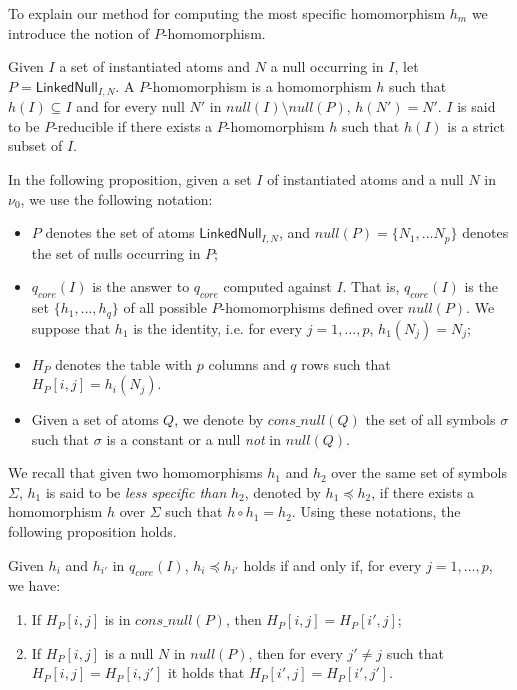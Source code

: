 
To explain our method for computing the most specific homomorphism $h_m$ we introduce the notion of $P$-homomorphism.

\begin{definition}
    Given $I$ a set of instantiated atoms and $N$ a null occurring in $I$, let $P=\textsf{LinkedNull}_{I,N}$.
    A $P$-homomorphism is a homomorphism $h$ such that $h(I) \subseteq I$ and for every null $N'$ in $null(I) \setminus null(P)$, $h(N')=N'$.
    $I$ is said to be $P$-reducible if there exists a $P$-homomorphism $h$ such that $h(I)$ is a strict subset of $I$.
\end{definition}

In the following proposition, given a set $I$ of instantiated atoms and a null $N$ in $\nu_0$, we use the following notation:
\begin{itemize}
    \item $P$ denotes the set of atoms $\textsf{LinkedNull}_{I,N}$, and $null(P)=\{N_1, \ldots N_p\}$ denotes the set of nulls occurring in $P$;

    \item $q_{core}(I)$ is the answer to $q_{core}$ computed against $I$.
          That is, $q_{core}(I)$ is the set $\{h_1, \ldots, h_q\}$ of all possible $P$-homomor\-phisms defined over $null(P)$.
          We suppose that $h_1$ is the identity, i.e. for every $j=1,\ldots,p$, $h_1(N_j)=N_j$;

    \item $H_P$ denotes the table with $p$ columns and $q$ rows such that $H_P[i,j] = h_i(N_j)$.

    \item Given a set of atoms $Q$, we denote by $cons\_null(Q)$ the set of all symbols $\sigma$ such that $\sigma$ is a constant or a null \emph{not} in $null(Q)$.
\end{itemize}

We recall that given two homomorphisms $h_1$ and $h_2$ over the same set of symbols $\Sigma$, $h_1$ is said to be \emph{less specific than} $h_2$, denoted by $h_1 \preceq h_2$, if there exists a homomorphism $h$ over $\Sigma$ such that $h \circ h_{1}=h_2$.
Using these notations, the following proposition holds.

\begin{proposition}
    \label{prop:spec}
    Given $h_i$ and $h_{i'}$ in $q_{core}(I)$, $h_i \preceq h_{i'}$ holds if and only if, for every $j=1, \dots, p$, we have:
    \begin{enumerate}
        \item If $H_P[i,j]$ is in $cons\_null(P)$, then $H_P[i,j] = H_P[i',j]$;
        \item If $H_P[i,j]$ is a null $N$ in $null(P)$, then for every $j' \ne j$ such that $H_P[i,j] = H_P[i,j']$ it holds that $H_P[i',j] = H_P[i',j']$.
    \end{enumerate}
\end{proposition}

